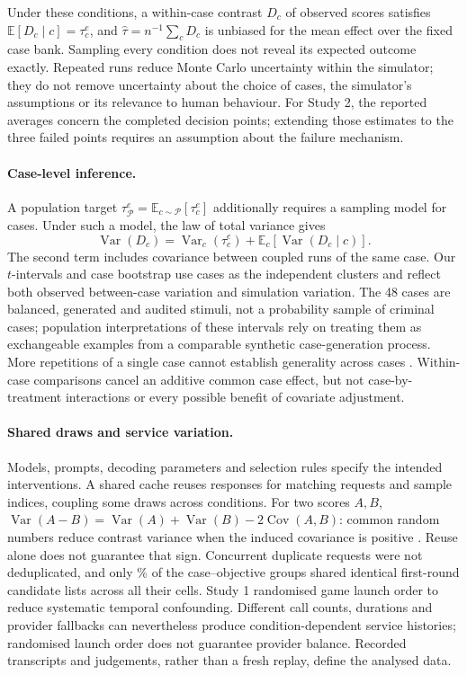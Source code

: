 \documentclass[10pt,a4paper]{article}
\theoremstyle{remark}
\newcommand{\E}{\mathbb{E}}
\begin{document}
Under these conditions, a within-case contrast $D_c$ of observed scores satisfies
$\E[D_c\mid c]=\tau^e_c$, and $\hat\tau=n^{-1}\sum_cD_c$ is unbiased for the mean effect over the fixed case bank.
Sampling every condition does not reveal its expected outcome exactly. Repeated runs reduce Monte Carlo uncertainty
within the simulator; they do not remove uncertainty about the choice of cases, the simulator's assumptions or its
relevance to human behaviour. For Study 2, the reported averages concern the completed decision points; extending
those estimates to the three failed points requires an assumption about the failure mechanism.

\paragraph{Case-level inference.}
A population target $\tau^e_{\mathcal P}=\E_{c\sim\mathcal P}[\tau^e_c]$ additionally requires a sampling model for
cases. Under such a model, the law of total variance gives
\begin{equation}
\operatorname{Var}(D_c)=\operatorname{Var}_c(\tau^e_c)+
\E_c[\operatorname{Var}(D_c\mid c)].
\end{equation}
The second term includes covariance between coupled runs of the same case. Our $t$-intervals and case bootstrap
use cases as the independent clusters and reflect both observed between-case variation and simulation variation.
The 48 cases are balanced, generated and audited stimuli, not a probability sample of criminal cases; population
interpretations of these intervals rely on treating them as exchangeable examples from a comparable synthetic
case-generation process. More repetitions of a single case cannot establish generality across cases
\citep{judd2012,westfall2014}. Within-case comparisons cancel an additive common case effect, but not
case-by-treatment interactions or every possible benefit of covariate adjustment.

\paragraph{Shared draws and service variation.}
Models, prompts, decoding parameters and selection rules specify the intended interventions. A shared cache reuses
responses for matching requests and sample indices, coupling some draws across conditions. For two scores $A,B$,
$\operatorname{Var}(A-B)=\operatorname{Var}(A)+\operatorname{Var}(B)-2\operatorname{Cov}(A,B)$: common random
numbers reduce contrast variance when the induced covariance is positive \citep{law2015}. Reuse alone does not
guarantee that sign. Concurrent duplicate requests were not deduplicated, and only \CRNShare\% of the
case--objective groups shared identical first-round candidate lists across all their cells. Study 1 randomised game
launch order to reduce systematic temporal confounding. Different call counts, durations and provider fallbacks
can nevertheless produce condition-dependent service histories; randomised launch order does not guarantee
provider balance. Recorded transcripts and judgements, rather than a fresh replay, define the analysed data.
\end{document}
